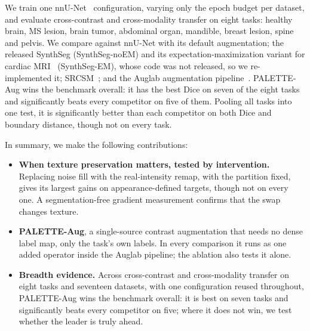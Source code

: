 We train one nnU-Net~\cite{isensee2021nnunet} configuration, varying only the
epoch budget per dataset, and evaluate cross-contrast and cross-modality
transfer on eight tasks: healthy brain, MS lesion, brain tumor,
abdominal organ, mandible, breast lesion, spine and pelvis. We compare against
nnU-Net with its default augmentation; the released SynthSeg (SynthSeg-noEM)
and its expectation-maximization variant for cardiac
MRI~\cite[\S5.4]{billot2023synthseg} (SynthSeg-EM), whose code was not
released, so we re-implemented it; SRCSM~\cite{thaler2025semrandconv}; and the
Auglab augmentation pipeline~\cite{molinier2026auglab}. PALETTE-Aug wins the benchmark
overall: it has the best Dice on seven of the eight tasks and significantly beats
every competitor on five of them. Pooling all tasks into one test, it is
significantly better than each competitor on both Dice and boundary distance,
though not on every task.

In summary, we make the following contributions:
\begin{itemize}
    \item \textbf{When texture preservation matters, tested by intervention.}
    Replacing noise fill with the real-intensity remap, with the partition fixed,
    gives its largest gains on appearance-defined targets, though not on every
    one. A segmentation-free gradient measurement
    confirms that the swap changes texture.
    \item \textbf{PALETTE-Aug}, a single-source contrast augmentation that
    needs no dense label map, only the task's own labels. In every comparison
    it runs as one added operator inside the Auglab pipeline; the ablation also
    tests it alone.
    \item \textbf{Breadth evidence.} Across cross-contrast and cross-modality
    transfer on eight tasks and seventeen datasets, with one
    configuration reused throughout, PALETTE-Aug wins the benchmark overall: it is best on seven tasks and
    significantly beats every competitor on five; where it does not win, we
    test whether the leader is truly ahead.
\end{itemize}
